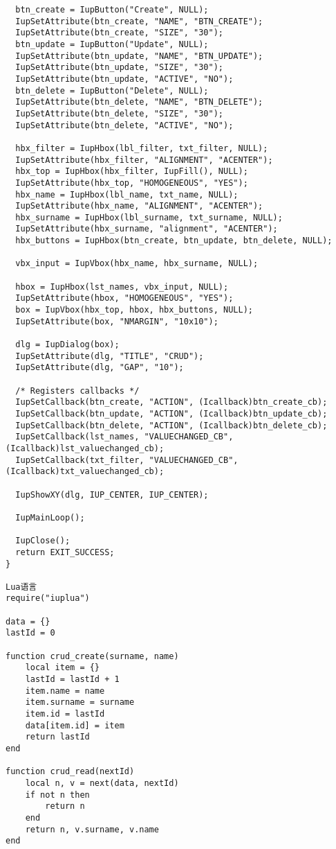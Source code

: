 \documentclass{ctexart}
\begin{document}
\begin{lstlisting}
  btn_create = IupButton("Create", NULL); 
  IupSetAttribute(btn_create, "NAME", "BTN_CREATE");
  IupSetAttribute(btn_create, "SIZE", "30");
  btn_update = IupButton("Update", NULL);
  IupSetAttribute(btn_update, "NAME", "BTN_UPDATE");
  IupSetAttribute(btn_update, "SIZE", "30");
  IupSetAttribute(btn_update, "ACTIVE", "NO");
  btn_delete = IupButton("Delete", NULL);
  IupSetAttribute(btn_delete, "NAME", "BTN_DELETE");
  IupSetAttribute(btn_delete, "SIZE", "30");
  IupSetAttribute(btn_delete, "ACTIVE", "NO");

  hbx_filter = IupHbox(lbl_filter, txt_filter, NULL);
  IupSetAttribute(hbx_filter, "ALIGNMENT", "ACENTER");
  hbx_top = IupHbox(hbx_filter, IupFill(), NULL);
  IupSetAttribute(hbx_top, "HOMOGENEOUS", "YES");
  hbx_name = IupHbox(lbl_name, txt_name, NULL); 
  IupSetAttribute(hbx_name, "ALIGNMENT", "ACENTER");
  hbx_surname = IupHbox(lbl_surname, txt_surname, NULL);
  IupSetAttribute(hbx_surname, "alignment", "ACENTER");
  hbx_buttons = IupHbox(btn_create, btn_update, btn_delete, NULL);

  vbx_input = IupVbox(hbx_name, hbx_surname, NULL);

  hbox = IupHbox(lst_names, vbx_input, NULL);
  IupSetAttribute(hbox, "HOMOGENEOUS", "YES");
  box = IupVbox(hbx_top, hbox, hbx_buttons, NULL);
  IupSetAttribute(box, "NMARGIN", "10x10");

  dlg = IupDialog(box);
  IupSetAttribute(dlg, "TITLE", "CRUD");
  IupSetAttribute(dlg, "GAP", "10");

  /* Registers callbacks */
  IupSetCallback(btn_create, "ACTION", (Icallback)btn_create_cb);
  IupSetCallback(btn_update, "ACTION", (Icallback)btn_update_cb);
  IupSetCallback(btn_delete, "ACTION", (Icallback)btn_delete_cb);
  IupSetCallback(lst_names, "VALUECHANGED_CB", (Icallback)lst_valuechanged_cb);
  IupSetCallback(txt_filter, "VALUECHANGED_CB", (Icallback)txt_valuechanged_cb);

  IupShowXY(dlg, IUP_CENTER, IUP_CENTER);

  IupMainLoop();

  IupClose();
  return EXIT_SUCCESS;
}

Lua语言
require("iuplua")

data = {}
lastId = 0

function crud_create(surname, name)
	local item = {}
	lastId = lastId + 1
	item.name = name
	item.surname = surname
	item.id = lastId
	data[item.id] = item
	return lastId
end

function crud_read(nextId)
	local n, v = next(data, nextId)
	if not n then
		return n
	end
	return n, v.surname, v.name
end


\end{lstlisting}
\end{document}
